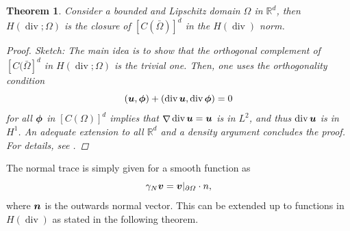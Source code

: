 \documentclass{article}
\renewcommand{\vec}{\vectorsym}
\DeclareMathOperator{\grad}{\nabla}
\DeclareMathOperator{\dive}{\text{div}}
\newcommand{\R}{\mathbb{R}}
\newtheorem{theorem}{Theorem}
\begin{document}
\begin{theorem} Consider a bounded and Lipschitz domain $\Omega$ in $\R^d$, then $H(\dive;\Omega)$ is the closure of $[C(\bar\Omega)]^d$ in the $H(\dive)$ norm.
    \begin{proof}
        Sketch: The main idea is to show that the orthogonal complement of $[C(\bar\Omega]^d$ in $H(\dive;\Omega)$ is the trivial one. Then, one uses the orthogonality condition 
            $$ (\vec u, \vec \phi) + (\dive \vec u, \dive \vec \phi) = 0$$
        for all $\vec\phi$ in $[C(\Omega)]^d$ implies that $\grad \dive\vec u = \vec u$ is in $L^2$, and thus $\dive \vec u$ is in $H^1$. An adequate extension to all $\R^d$ and a density argument concludes the proof. For details, see \cite[Thm 3.22]{monk2003finite}. 
    \end{proof}
\end{theorem}
The normal trace is simply given for a smooth function as 
    $$ \gamma_N \vec v = \vec v|_{\partial\Omega} \cdot n, $$
where $\vec n $ is the outwards normal vector. This can be extended up to functions in $H(\dive)$ as stated in the following theorem. 
\end{document}
